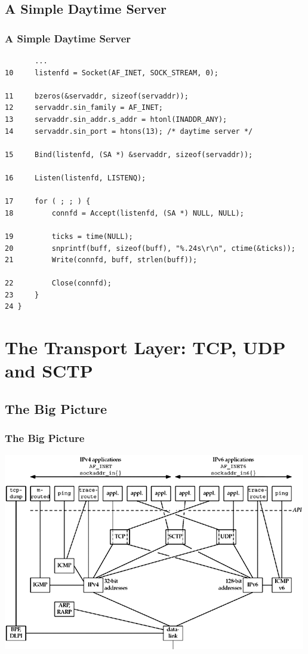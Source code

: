 \documentclass[notes,serif]{beamer}
\begin{document}
\subsection{A Simple Daytime Server}

\begin{frame}[containsverbatim]
\frametitle{A Simple Daytime Server}
  {\tiny
  \begin{verbatim}
       ...
10     listenfd = Socket(AF_INET, SOCK_STREAM, 0);

11     bzeros(&servaddr, sizeof(servaddr));
12     servaddr.sin_family = AF_INET;
13     servaddr.sin_addr.s_addr = htonl(INADDR_ANY);
14     servaddr.sin_port = htons(13); /* daytime server */

15     Bind(listenfd, (SA *) &servaddr, sizeof(servaddr));

16     Listen(listenfd, LISTENQ);

17     for ( ; ; ) {
18         connfd = Accept(listenfd, (SA *) NULL, NULL);

19         ticks = time(NULL);
20         snprintf(buff, sizeof(buff), "%.24s\r\n", ctime(&ticks));
21         Write(connfd, buff, strlen(buff));

22         Close(connfd);
23     }
24 }
  \end{verbatim}
  }
\end{frame}

\section{The Transport Layer: TCP, UDP and SCTP}

\subsection{The Big Picture}
\begin{frame}
  \frametitle{The Big Picture}
  \begin{center}
  \includegraphics[width=.8\textwidth]{figs/02fig01.png}
  \end{center}
\end{frame}
\end{document}
